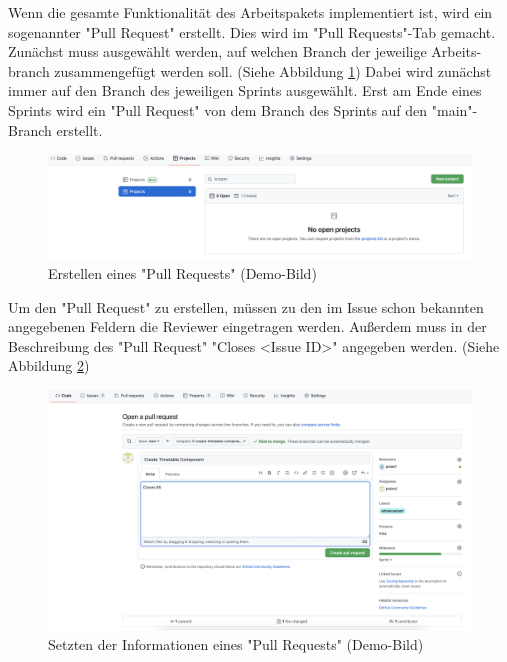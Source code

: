 
Wenn die gesamte Funktionalität des Arbeitspakets implementiert ist, wird ein sogenannter "Pull Request" erstellt. Dies wird im "Pull Requests"-Tab gemacht. Zunächst muss ausgewählt werden, auf welchen Branch der jeweilige Arbeits-branch zusammengefügt werden soll. (Siehe Abbildung \ref{fig:createPullRequest}) Dabei wird zunächst immer auf den Branch des jeweiligen Sprints ausgewählt. Erst am Ende eines Sprints wird ein "Pull Request" von dem Branch des Sprints auf den "main"-Branch erstellt.

\begin{figure}[H]
    \centering
    \includegraphics[width=\textwidth]{media/ProjectManagement/CreateProject.png}
    \caption{Erstellen eines "Pull Requests" (Demo-Bild)}
    \label{fig:createPullRequest}
\end{figure}

Um den "Pull Request" zu erstellen, müssen zu den im Issue schon bekannten angegebenen Feldern die Reviewer eingetragen werden. Außerdem muss in der Beschreibung des "Pull Request" "Closes \textless Issue ID\textgreater" angegeben werden. (Siehe Abbildung \ref{fig:EnterPullRequestInfo})

\begin{figure}[H]
    \centering
    \includegraphics[width=\textwidth]{media/ProjectManagement/EnterPullInfo.png}
    \caption{Setzten der Informationen eines "Pull Requests" (Demo-Bild)}
    \label{fig:EnterPullRequestInfo}
\end{figure}

